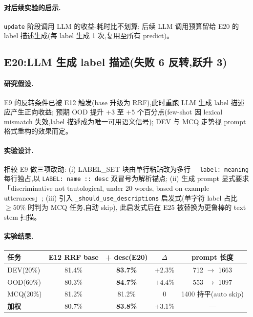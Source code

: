 \documentclass[11pt,a4paper]{ctexart}
\begin{document}
\paragraph{对后续实验的启示.}\texttt{update} 阶段调用 LLM 的收益-耗时比不划算;
后续 LLM 调用预算留给 E20 的 label 描述生成(每 label 生成 1 次,复用至所有 predict)。

\subsection{E20:LLM 生成 label 描述(失败 6 反转,跃升 3)}

\paragraph{研究假设.}E9 的反转条件已被 E12 触发(base 升级为 RRF),此时重跑 LLM 生成 label 描述应产生正向收益;
预期 OOD 提升 $+3$ 至 $+5$ 个百分点(few-shot 因 lexical mismatch 失效,label 描述成为唯一可用语义信号);
DEV 与 MCQ 走势视 prompt 格式重构的效果而定。

\paragraph{实验设计.}相较 E9 做三项改动:
(i) LABEL\_SET 块由单行粘贴改为多行 \verb|  label: meaning| 每行独占,以 \verb|LABEL: name :: desc| 双冒号为解析锚点;
(ii) 生成 prompt 显式要求「discriminative not tautological, under 20 words, based on example utterances」;
(iii) 引入 \texttt{\_should\_use\_descriptions} 启发式(单字符 label 占比 $\ge 50\%$ 时判为 MCQ 任务,自动 skip),
此启发式后在 E25 被替换为更鲁棒的 text stem 扫描。

\paragraph{实验结果.}

\begin{table}[h]
\centering
\small
\begin{tabular}{lcccc}
\toprule
任务 & E12 RRF base & \textbf{+ desc(E20)} & $\Delta$ & prompt 长度 \\
\midrule
DEV(20\%) & 81.4\% & \textbf{83.7\%} & $\mathbf{+2.3\%}$ & 712 $\to$ 1663 \\
OOD(60\%) & 80.3\% & \textbf{84.7\%} & $\mathbf{+4.4\%}$ & 553 $\to$ 1097 \\
MCQ(20\%) & 81.2\% & 81.2\% & 0 & 1400 持平(auto skip) \\
\midrule
\textbf{加权} & 80.7\% & \textbf{83.8\%} & $\mathbf{+3.1\%}$ & — \\
\bottomrule
\end{tabular}
\end{table}
\end{document}

